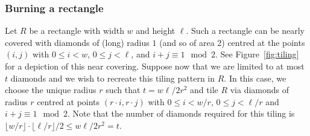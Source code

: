 \documentclass[12pt]{article}
\theoremstyle{remark}
\begin{document}
\subsubsection{Burning a rectangle}

Let $R$ be a rectangle with width $w$ and height $\ell$. Such a rectangle can be nearly covered with diamonds of (long) radius $1$ (and so of area 2) centred at the points $(i,j)$ with $0 \leq i < w$, $0 \leq j < \ell$, and $i+j \equiv 1 \mod 2$. See Figure~\ref{fig:tiling} for a depiction of this near covering. Suppose now that we are limited to at most $t$ diamonds and we wish to recreate this tiling pattern in $R$. In this case, we choose the unique radius $r$ such that $t = w\ell/2r^2$ and tile $R$ via diamonds of radius $r$ centred at points $(r \cdot i, r \cdot j)$ with $0 \leq i < w/r$, $0 \leq j < \ell/r$ and $i+j \equiv 1 \mod 2$. Note that the number of diamonds required for this tiling is $\lfloor w/r \rfloor \cdot \lfloor \ell/r \rfloor / 2 \leq w\ell/2r^2 = t$. 
 
\end{document}
